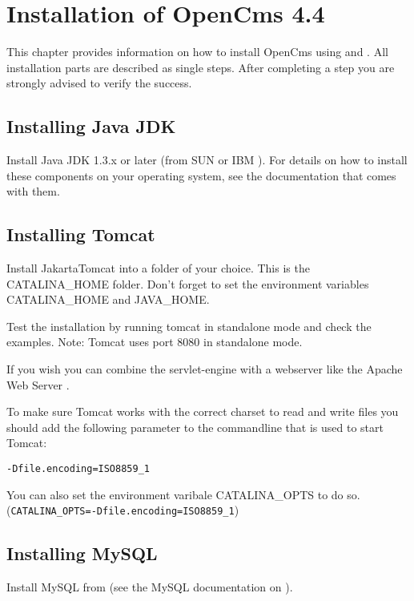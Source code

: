 \chapter{Installation of OpenCms 4.4}

This chapter provides information on how to install OpenCms using
 and
. All installation parts are
described as single steps. After completing a step you are
strongly advised to verify the success.

\section{Installing Java JDK}
Install Java JDK 1.3.x or later (from SUN
or IBM
).
For details on how to install these components on your operating
system, see the documentation that comes with them.

\section{Installing Tomcat}

Install JakartaTomcat
into a folder of your choice. This is the CATALINA\_HOME folder.
Don't forget to set the environment variables CATALINA\_HOME and
JAVA\_HOME.

Test the installation by running tomcat in standalone mode and
check the examples. Note: Tomcat uses port 8080 in standalone
mode.

If you wish you can combine the servlet-engine with a webserver
like the Apache Web Server
.

To make sure Tomcat works with the correct charset to read and
write files you should add the following parameter to the
commandline that is used to start Tomcat:

\texttt{-Dfile.encoding=ISO8859\_1}

You can also set the environment varibale CATALINA\_OPTS to do so.\\
(\texttt{CATALINA\_OPTS=-Dfile.encoding=ISO8859\_1})

\section{Installing MySQL}
Install MySQL from
(see the MySQL documentation on
).

